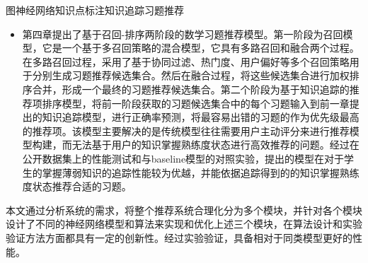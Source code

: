 \begin{abstractC}{图神经网络}{知识点标注}{知识追踪}{习题推荐}{}
\begin{itemize}
        \item 第四章提出了基于召回-排序两阶段的数学习题推荐模型。第一阶段为召回模型，它是一个基于多召回策略的混合模型，它具有多路召回和融合两个过程。在多路召回过程，采用了基于协同过滤、热门度、用户偏好等多个召回策略用于分别生成习题推荐候选集合。然后在融合过程，将这些候选集合进行加权排序合并，形成一个最终的习题推荐候选集合。第二个阶段为基于知识追踪的推荐项排序模型，将前一阶段获取的习题候选集合中的每个习题输入到前一章提出的知识追踪模型，进行正确率预测，将最容易出错的习题的作为优先级最高的推荐项。该模型主要解决的是传统模型往往需要用户主动评分来进行推荐模型构建，而无法基于用户的知识掌握熟练度状态进行高效推荐的问题。经过在公开数据集上的性能测试和与baseline模型的对照实验，提出的模型在对于学生的掌握薄弱知识的追踪性能较为优越，并能依据追踪得到的的知识掌握熟练度状态推荐合适的习题。
    \end{itemize}

    本文通过分析系统的需求，将整个推荐系统合理化分为多个模块，并针对各个模块设计了不同的神经网络模型和算法来实现和优化上述三个模块，在算法设计和实验验证方法方面都具有一定的创新性。经过实验验证，具备相对于同类模型更好的性能。
\end{abstractC}
